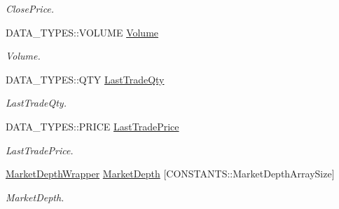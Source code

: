 \begin{DoxyCompactItemize}
\begin{DoxyCompactList}\small\item\em Close\-Price. \end{DoxyCompactList}\item 
\hypertarget{class_a_p_i2_1_1_c_o_m_m_o_n_1_1_market_data_wrapper_a7d2fa1fee9f8da80ffce61e543b21f87}{D\-A\-T\-A\-\_\-\-T\-Y\-P\-E\-S\-::\-V\-O\-L\-U\-M\-E \hyperlink{class_a_p_i2_1_1_c_o_m_m_o_n_1_1_market_data_wrapper_a7d2fa1fee9f8da80ffce61e543b21f87}{Volume}}\label{class_a_p_i2_1_1_c_o_m_m_o_n_1_1_market_data_wrapper_a7d2fa1fee9f8da80ffce61e543b21f87}

\begin{DoxyCompactList}\small\item\em Volume. \end{DoxyCompactList}\item 
\hypertarget{class_a_p_i2_1_1_c_o_m_m_o_n_1_1_market_data_wrapper_a6bf5746491b0bef6456bd136f07bbbee}{D\-A\-T\-A\-\_\-\-T\-Y\-P\-E\-S\-::\-Q\-T\-Y \hyperlink{class_a_p_i2_1_1_c_o_m_m_o_n_1_1_market_data_wrapper_a6bf5746491b0bef6456bd136f07bbbee}{Last\-Trade\-Qty}}\label{class_a_p_i2_1_1_c_o_m_m_o_n_1_1_market_data_wrapper_a6bf5746491b0bef6456bd136f07bbbee}

\begin{DoxyCompactList}\small\item\em Last\-Trade\-Qty. \end{DoxyCompactList}\item 
\hypertarget{class_a_p_i2_1_1_c_o_m_m_o_n_1_1_market_data_wrapper_a1bbb203c79340593e08bad234320de03}{D\-A\-T\-A\-\_\-\-T\-Y\-P\-E\-S\-::\-P\-R\-I\-C\-E \hyperlink{class_a_p_i2_1_1_c_o_m_m_o_n_1_1_market_data_wrapper_a1bbb203c79340593e08bad234320de03}{Last\-Trade\-Price}}\label{class_a_p_i2_1_1_c_o_m_m_o_n_1_1_market_data_wrapper_a1bbb203c79340593e08bad234320de03}

\begin{DoxyCompactList}\small\item\em Last\-Trade\-Price. \end{DoxyCompactList}\item 
\hypertarget{class_a_p_i2_1_1_c_o_m_m_o_n_1_1_market_data_wrapper_ab98e717e6aaf83a98263a22af5340195}{\hyperlink{class_a_p_i2_1_1_c_o_m_m_o_n_1_1_market_depth_wrapper}{Market\-Depth\-Wrapper} \hyperlink{class_a_p_i2_1_1_c_o_m_m_o_n_1_1_market_data_wrapper_ab98e717e6aaf83a98263a22af5340195}{Market\-Depth} \mbox{[}C\-O\-N\-S\-T\-A\-N\-T\-S\-::\-Market\-Depth\-Array\-Size\mbox{]}}\label{class_a_p_i2_1_1_c_o_m_m_o_n_1_1_market_data_wrapper_ab98e717e6aaf83a98263a22af5340195}

\begin{DoxyCompactList}\small\item\em Market\-Depth. \end{DoxyCompactList}\end{DoxyCompactItemize}


